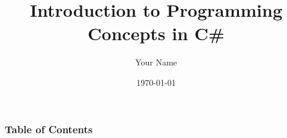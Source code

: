 \documentclass{beamer}
\title{Introduction to Programming Concepts in C\#}
\author{Your Name}
\date{\today}
\begin{document}
\frame{\titlepage}

\begin{frame}
\frametitle{Table of Contents}
\tableofcontents
\end{frame}









\end{document}
